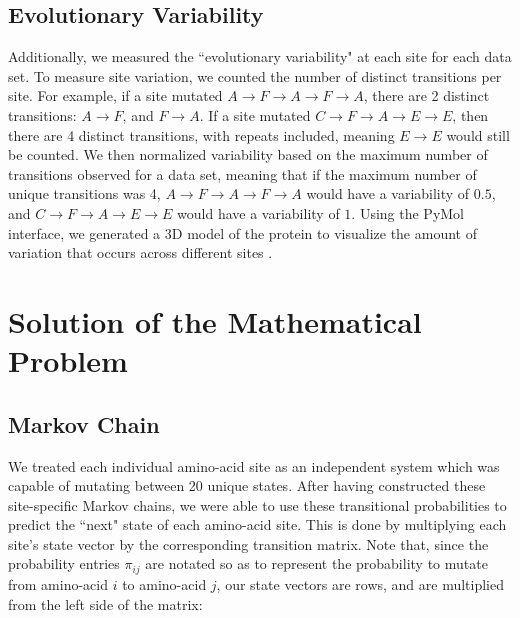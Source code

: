 \documentclass[12pt]{article}
\begin{document}
\begin{multicols}{2}
\subsection{Evolutionary Variability}

Additionally, we measured the ``evolutionary variability" at each site for each data set. To measure site variation, we counted the number of distinct transitions per site. For example, if a site mutated $A \rightarrow F \rightarrow A \rightarrow F \rightarrow A $, there are 2 distinct transitions: $A \rightarrow F$, and $F \rightarrow A$. If a site mutated $C \rightarrow F \rightarrow A \rightarrow E \rightarrow E$, then there are 4 distinct transitions, with repeats included, meaning $E \rightarrow E$ would still be counted. We then normalized variability based on the maximum number of transitions observed for a data set, meaning that if the maximum number of unique transitions was 4, $A \rightarrow F \rightarrow A \rightarrow F \rightarrow A$ would have a variability of $0.5$, and $C \rightarrow F \rightarrow A \rightarrow E \rightarrow E$ would have a variability of $1$. Using the PyMol interface, we generated a 3D model of the protein to visualize the amount of variation that occurs across different sites \citep{delano2002pymol}.
    
\section{Solution of the Mathematical Problem}
\subsection{Markov Chain}
We treated each individual amino-acid site as an independent system which was capable of mutating between 20 unique states. After having constructed these site-specific Markov chains, we were able to use these transitional probabilities to predict the ``next" state of each amino-acid site. This is done by multiplying each site's state vector by the corresponding transition matrix. Note that, since the probability entries $\pi_{ij}$ are notated so as to represent the probability to mutate from amino-acid $i$ to amino-acid $j$, our state vectors are rows, and are multiplied from the left side of the matrix:


\end{multicols}
\end{document}
